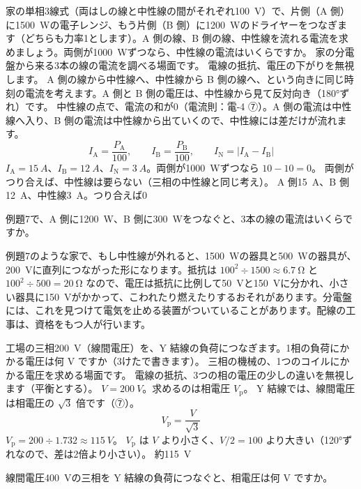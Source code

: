 \label{ph:電-11:ex7}
\begin{phreidai}[単相3線式の中性線]
家の単相3線式（両はしの線と中性線の間がそれぞれ\qty{100}{V}）で、片側（A 側）に\qty{1500}{W}の電子レンジ、もう片側（B 側）に\qty{1200}{W}のドライヤーをつなぎます（どちらも力率1とします）。A 側の線、B 側の線、中性線を流れる電流を求めましょう。両側が\qty{1000}{W}ずつなら、中性線の電流はいくらですか。
\phbamen
家の分電盤から来る3本の線の電流を調べる場面です。
\phmushi
電線の抵抗、電圧の下がりを無視します。
\phzu
A 側の線から中性線へ、中性線から B 側の線へ、という向きに同じ時刻の電流を考えます。A 側と B 側の電圧は、中性線から見て反対向き（180°ずれ）です。
\phriyu
中性線の点で、電流の和が0（電流則：電-4 ⑦）。A 側の電流は中性線へ入り、B 側の電流は中性線から出ていくので、中性線には差だけが流れます。
\phtateru
\[I_{\mathrm A}=\frac{P_{\mathrm A}}{100},\qquad I_{\mathrm B}=\frac{P_{\mathrm B}}{100},\qquad I_{\mathrm N}=|I_{\mathrm A}-I_{\mathrm B}|\]
\phtoku
$I_{\mathrm A}=\qty{15}{A}$、$I_{\mathrm B}=\qty{12}{A}$、$I_{\mathrm N}=\qty{3}{A}$。両側が\qty{1000}{W}ずつなら $10-10=0$。
\phtashikame
両側がつり合えば、中性線は要らない（三相の中性線と同じ考え）。
\kotae A 側\qty{15}{A}、B 側\qty{12}{A}、中性線\qty{3}{A}。つり合えば0
\end{phreidai}
\begin{jibun}
例題7で、A 側に\qty{1200}{W}、B 側に\qty{300}{W}をつなぐと、3本の線の電流はいくらですか。
\end{jibun}

\begin{phmijika}
例題7のような家で、もし中性線が外れると、\qty{1500}{W}の器具と\qty{500}{W}の器具が、\qty{200}{V}に直列につながった形になります。抵抗は $100^2\div1500\approx\qty{6.7}{\ohm}$ と $100^2\div500=\qty{20}{\ohm}$ なので、電圧は抵抗に比例して\qty{50}{V}と\qty{150}{V}に分かれ、小さい器具に\qty{150}{V}がかかって、こわれたり燃えたりするおそれがあります。分電盤には、これを見つけて電気を止める装置がついていることがあります。配線の工事は、資格をもつ人が行います。
\end{phmijika}

\label{ph:電-11:ex8}
\begin{phreidai}
工場の三相\qty{200}{V}（線間電圧）を、Y 結線の負荷につなぎます。1相の負荷にかかる電圧は何 V ですか（3けたで書きます）。
\phbamen
三相の機械の、1つのコイルにかかる電圧を求める場面です。
\phmushi
電線の抵抗、3つの相の電圧の少しの違いを無視します（平衡とする）。
\phzu
$V=\qty{200}{V}$。求めるのは相電圧 $V_{\mathrm p}$。
\phriyu
Y 結線では、線間電圧は相電圧の $\sqrt3$ 倍です（⑦）。
\phtateru
\[V_{\mathrm p}=\frac{V}{\sqrt3}\]
\phtoku
$V_{\mathrm p}=200\div1.732\approx\qty{115}{V}$。
\phtashikame
$V_{\mathrm p}$ は $V$ より小さく、$V/2=100$ より大きい（120°ずれなので、差は2倍より小さい）。
\kotae 約\qty{115}{V}
\end{phreidai}
\begin{jibun}
線間電圧\qty{400}{V}の三相を Y 結線の負荷につなぐと、相電圧は何 V ですか。
\end{jibun}


